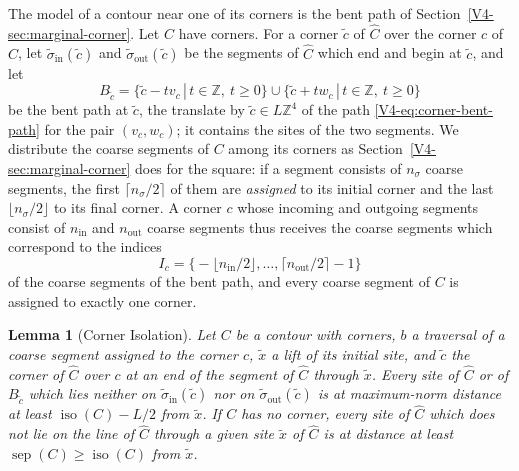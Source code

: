 \documentclass[11pt]{article}
\newcommand{\iso}{\operatorname{iso}}
\newcommand{\sep}{\operatorname{sep}}
\numberwithin{equation}{section}
\newtheorem{lemma}[theorem]{Lemma}
\theoremstyle{remark}
\theoremstyle{plain}
\begin{document}
The model of a contour near one of its corners is the bent path of Section~\ref{V4-sec:marginal-corner}. Let $C$ have corners. For a corner $\tilde c$ of $\widehat C$ over the corner $c$ of $C$, let $\tilde\sigma_{\mathrm{in}}(\tilde c)$ and $\tilde\sigma_{\mathrm{out}}(\tilde c)$ be the segments of $\widehat C$ which end and begin at $\tilde c$, and let
\begin{equation}\label{eq:torus-bent-path}
    B_{\tilde c}=\{\tilde c-tv_c\, | \,t\in\mathbb Z,\ t\geqslant 0\}\cup\{\tilde c+tw_c\, | \,t\in\mathbb Z,\ t\geqslant 0\}
\end{equation}
be the bent path at $\tilde c$, the translate by $\tilde c\in L\mathbb Z^4$ of the path \eqref{V4-eq:corner-bent-path} for the pair $(v_c,w_c)$; it contains the sites of the two segments. We distribute the coarse segments of $C$ among its corners as Section~\ref{V4-sec:marginal-corner} does for the square: if a segment consists of $n_{\sigma}$ coarse segments, the first $\lceil n_{\sigma}/2\rceil$ of them are \emph{assigned} to its initial corner and the last $\lfloor n_{\sigma}/2\rfloor$ to its final corner. A corner $c$ whose incoming and outgoing segments consist of $n_{\mathrm{in}}$ and $n_{\mathrm{out}}$ coarse segments thus receives the coarse segments which correspond to the indices
\begin{equation}\label{eq:torus-assigned-indices}
    I_c=\bigl\{-\lfloor n_{\mathrm{in}}/2\rfloor,\ldots,\lceil n_{\mathrm{out}}/2\rceil-1\bigr\}
\end{equation}
of the coarse segments of the bent path, and every coarse segment of $C$ is assigned to exactly one corner.

\begin{lemma}[Corner Isolation]\label{lem:torus-corner-isolation}
Let $C$ be a contour with corners, $b$ a traversal of a coarse segment assigned to the corner $c$, $\tilde x$ a lift of its initial site, and $\tilde c$ the corner of $\widehat C$ over $c$ at an end of the segment of $\widehat C$ through $\tilde x$. Every site of $\widehat C$ or of $B_{\tilde c}$ which lies neither on $\tilde\sigma_{\mathrm{in}}(\tilde c)$ nor on $\tilde\sigma_{\mathrm{out}}(\tilde c)$ is at maximum-norm distance at least $\iso(C)-L/2$ from $\tilde x$. If $C$ has no corner, every site of $\widehat C$ which does not lie on the line of $\widehat C$ through a given site $\tilde x$ of $\widehat C$ is at distance at least $\sep(C)\geqslant \iso(C)$ from $\tilde x$.
\end{lemma}
\end{document}
